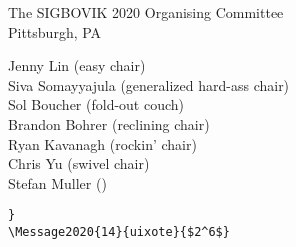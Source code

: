 \documentclass[12pt]{article}
\begin{document}
\begin{flushright}
The SIGBOVIK 2020 Organising Committee\\
Pittsburgh, PA

Jenny Lin (easy chair)\\
Siva Somayyajula (generalized hard-ass chair)\\
Sol Boucher (fold-out couch)\\
Brandon Bohrer (reclining chair)\\
Ryan Kavanagh (rockin' chair)\\
Chris Yu (swivel chair)\\
Stefan Muller ()
\end{flushright}
\begin{verbatim}
}
\Message2020{14}{uixote}{$2^6$}
\end{verbatim}



\thispagestyle{empty}
\end{document}
